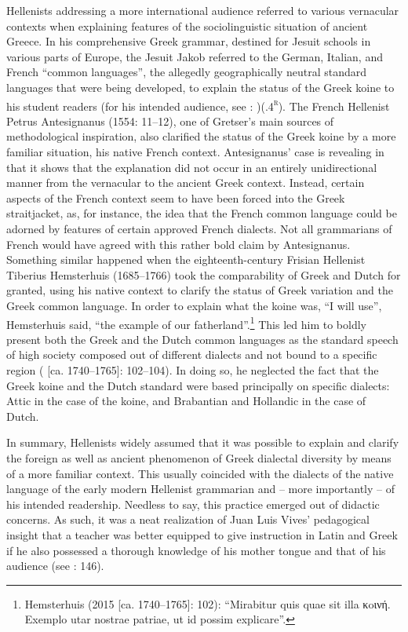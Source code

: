 Hellenists addressing a more international audience referred to various vernacular contexts when explaining features of the sociolinguistic situation of ancient Greece. In his comprehensive Greek grammar, destined for Jesuit schools in various parts of Europe, the Jesuit Jakob \citet[20]{Gretser1593} referred to the German, Italian, and French “common languages”, the allegedly geographically neutral standard languages that were being developed, to explain the status of the Greek koine to his student readers (for his intended audience, see \citealt{Gretser1593}: )(.4\textsc{\textsuperscript{r}}). The French Hellenist Petrus Antesignanus (1554: 11–12), one of Gretser’s main sources of methodological inspiration, also clarified the status of the Greek koine by a more familiar situation, his native French context. Antesignanus’ case is revealing in that it shows that the explanation did not occur in an entirely unidirectional manner from the vernacular to the ancient Greek context. Instead, certain aspects of the French context seem to have been forced into the Greek straitjacket, as, for instance, the idea that the French common language could be adorned by features of certain approved French dialects. Not all grammarians of French would have agreed with this rather bold claim by Antesignanus. Something similar happened when the eighteenth-century Frisian Hellenist Tiberius Hemsterhuis (1685–1766) took the comparability of Greek and Dutch for granted, using his native context to clarify the status of Greek variation and the Greek common language. In order to explain what the koine was, “I will use”, Hemsterhuis said, “the example of our fatherland”.\footnote{Hemsterhuis (2015 [ca. 1740–1765]: 102): “Mirabitur quis quae sit illa κoινή. Exemplo utar nostrae patriae, ut id possim explicare”.} This led him to boldly present both the Greek and the Dutch common languages as the standard speech of high society composed out of different dialects and not bound to a specific region (\citealt{Hemsterhuis2015} [ca. 1740–1765]: 102–104). In doing so, he neglected the fact that the Greek koine and the Dutch standard were based principally on specific dialects: Attic in the case of the koine, and Brabantian and Hollandic in the case of Dutch.

In summary, Hellenists widely assumed that it was possible to explain and clarify the foreign as well as ancient phenomenon of Greek dialectal diversity by means of a more familiar context. This usually coincided with the dialects of the native language of the early modern Hellenist grammarian and – more importantly – of his intended readership. Needless to say, this practice emerged out of didactic concerns. As such, it was a neat realization of Juan Luis Vives’ pedagogical insight that a teacher was better equipped to give instruction in Latin and Greek if he also possessed a thorough knowledge of his mother tongue and that of his audience (see \citealt{Padley1985}: 146).

